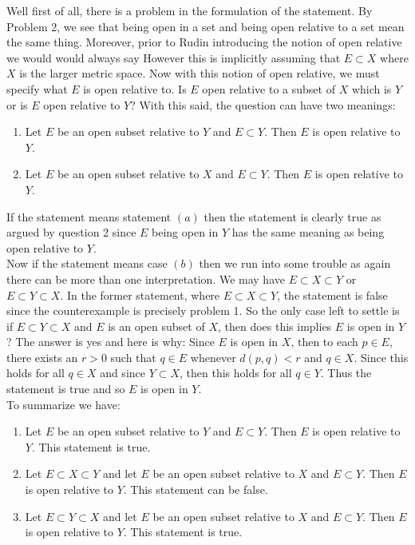\documentclass[12pt]{article}
\begin{document}
Well first of all, there is a problem in the formulation of the statement. By Problem 2, we see that being open in a set and being open relative to a set mean the same thing. Moreover, prior to Rudin introducing the notion of open relative we would would always say  However this is implicitly assuming that $E \subset X$ where $X$ is the larger metric space. Now with this notion of open relative, we must specify what $E$ is open relative to. Is $E$ open relative to a subset of $X$ which is $Y$ or is $E$ open relative to $Y$? With this said, the question can have two meanings: 
\begin{enumerate}
\item Let $E$ be an open subset relative to $Y$ and $E \subset Y$. Then $E$ is open relative to $Y$.
\item Let $E$ be an open subset relative to  $X$ and $E \subset Y$. Then $E$ is open relative to $Y$.
\end{enumerate} 

If the statement means statement $(a)$ then the statement is clearly true as argued by question 2 since $E$ being open in $Y$ has the same meaning as being open relative to $Y$. \\ 

Now if the statement means case $(b)$ then we run into some trouble as again there can be more than one interpretation. We may have $E \subset X \subset Y$ or $E \subset Y \subset X$. In the former statement, where $E \subset X \subset Y$, the statement is false since the counterexample is precisely problem 1. So the only case left to settle is if $E \subset Y \subset X$ and $E$ is an open subset of $X$, then does this implies $E$ is open in $Y$? The answer is yes and here is why: Since $E$ is open in $X$, then to each $p \in E$, there exists an $r>0$ such that $q \in E$ whenever $d(p,q)<r$ and $q \in X$. Since this holds for all $q \in X$ and since $Y \subset X$, then this holds for all $q \in Y$. Thus the statement  is true and so $E$ is open in $Y$. \\

To summarize we have:
\begin{enumerate}
\item Let $E$ be an open subset relative to $Y$ and $E \subset Y$. Then $E$ is open relative to $Y$. This statement is true.
\item Let $E \subset X \subset Y$ and let $E$ be an open subset relative to $X$ and $E \subset Y$. Then $E$ is open relative to $Y$. This statement can be false.
\item Let $E \subset Y \subset X$ and let $E$ be an open subset relative to $X$ and $E \subset Y$. Then $E$ is open relative to $Y$. This statement is true.
\end{enumerate}
\end{document}
